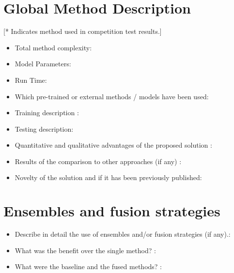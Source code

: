 \documentclass[12pt]{article}
\begin{document}
\section{Global Method Description}
[* Indicates method used in competition test results.]

\begin{itemize}
\item Total method complexity:\\
\item Model Parameters: \\

\item Run Time: \\

\item Which pre-trained or external methods / models have been used: \\


\item Training description : \\

\item Testing description: \\

\item Quantitative and qualitative advantages of the proposed solution :\\


\item Results of the comparison to other approaches (if any) : \\

\item Novelty of the solution and if it has been previously published: \\


\end{itemize}


\section{Ensembles and fusion strategies}
\begin{itemize}
\item Describe in detail the use of ensembles and/or fusion strategies (if any).:\\ 
\item What was the benefit over the single method? : \\
\item What were the baseline and the fused methods? :\\
\end{itemize}
\end{document}
